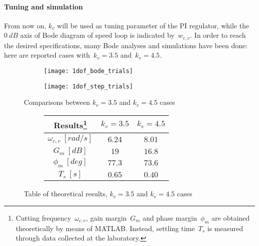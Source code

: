 \paragraph{Tuning and simulation}
From now on, $k_v$ will be used as tuning parameter of the PI regulator, while the~$0\ dB$ axis of Bode diagram of speed loop is indicated by~$w_{c,v}$. In order to reach the desired specifications, many Bode analyses and simulations have been done: here are reported cases with~$k_v=3.5$ and~$k_v=4.5$.
\begin{figure*}[h]
	\centering
	\begin{subfigure}{0.45\columnwidth}
		\texttt{[image: 1dof\_bode\_trials]}
		\label{fig:PI1dof_bode}
	\end{subfigure}
	\begin{subfigure}{0.42\columnwidth}
		\texttt{[image: 1dof\_step\_trials]}
		\label{fig:PI1dof_step}
	\end{subfigure}
	\caption{Comparisons between $k_v = 3.5$ and $k_v = 4.5$ cases}
	\vspace{5mm}
	\begin{subfigure}{0.6\columnwidth}
		\centering
		\begin{tabular}{|c|cc|}
			\hline
			Results\footnote{Cutting frequency~$\omega_{c,v}$, gain margin~$G_m$ and phase margin~$\phi_m$ are obtained theoretically by means of MATLAB. Instead, settling time~$T_s$ is measured through data collected at the laboratory.} & $k_v=3.5$ & $k_v=4.5$ \\
			\hline
			$\omega_{c,v}\ [rad/s]$ & $6.24$ & $8.01$ \\
			$G_m\ [dB]$ & $19$ & $16.8$ \\
			$\phi_m\ [deg]$ & $77.3$ & $73.6$ \\
			\hline
			$T_s\ [s]$ & $0.65$ & $0.40$ \\
			\hline
		\end{tabular}
	\end{subfigure}
	\caption{Table of theoretical results, $k_v = 3.5$ and $k_v = 4.5$ cases}
	\label{fig:Bode and Step PI 10}
\end{figure*}

